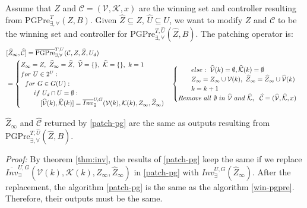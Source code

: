 Assume that $ Z $ and $ \mathcal{C} = (\mathcal{V},\mathcal{K},x) $ are the winning set and controller resulting from  $ \text{PGPre}_{\exists,\forall}^{T} (Z,B)$. Given $ \widehat{Z}\subseteq Z $,  $ \widehat{U}\subseteq U $, we want to modify $ Z $ and $ \mathcal{C} $ to be the winning set and controller for $ \text{PGPre}_{\exists, \forall}^{T,\widehat{U}}(\widehat{Z},B)$. The patching operator is:
{\small\begin{align}
\begin{split}
&[\widehat{Z}_{\infty},\widehat{\mathcal{C}}]=\overline{\text{PGPre}}_{\exists,\forall}^{T,U} (\mathcal{C},Z,\widehat{Z},U_d)\\
&= \begin{cases}
Z_{\infty} = Z,\ \widehat{Z}_{\infty}=\widehat{Z},\ \widehat{\mathcal{V}}=\{\},\ \widehat{\mathcal{K}}=\{\},\ k = 1\\
for\ U\in 2^U:\\
\ \ for\ G\in G(U):\\
\ \ \ \ \ \ if\ U_d\cap U = \emptyset:\\
\ \ \ \ \ \ \ \ \  [\widehat{\mathcal{V}}(k),\widehat{\mathcal{K}}(k)]=\overline{Inv}_{\exists}^{U,G}(\mathcal{V}(k),\mathcal{K}(k),Z_\infty, \widehat{Z}_\infty)\\
\end{cases}
\begin{cases}
\ \ \ \ \ \ else:\ \widehat{\mathcal{V}}(k)=\emptyset, \widehat{\mathcal{K}}(k) = \emptyset\\
\ \ \ \ \ \  Z_\infty = Z_\infty\cup \mathcal{V}(k),\ \widehat{Z}_{\infty} = \widehat{Z}_{\infty} \cup \widehat{\mathcal{V}}(k)\\
\ \ \ \ \ \ {\color{black} k = k+1}\\
Remove\ all\ \emptyset\ in\ \widehat{\mathcal{V}}\ and \ \widehat{\mathcal{K}},\ \ 
\widehat{\mathcal{C}} = (\widehat{\mathcal{V}},\widehat{\mathcal{K}},x)
\end{cases}\label{patch-pg}
\end{split}
\end{align}}

\begin{theorem}
	$ \widehat{Z}_\infty $ and $ \widehat{\mathcal{C}} $ returned by \eqref{patch-pg} are the same as outputs resulting from $ \text{PGPre}_{\exists, \forall}^{T,\widehat{U}}(\widehat{Z},B)$.	\label{thm:pg}
\end{theorem}

\emph{Proof:} By theorem \ref{thm:inv}, the results of \eqref{patch-pg} keep the same if we replace $ \overline{Inv}_{\exists}^{U,G}(\mathcal{V}(k),\mathcal{K}(k),Z_\infty, \widehat{Z}_\infty)$ in \eqref{patch-pg} with $ Inv_\exists^{U,G}(\widehat{Z}_{\infty}) $. After the replacement, the algorithm \eqref{patch-pg} is the same as the algorithm \eqref{win-pgpre}. Therefore, their outputs must be the same. \QEDB


